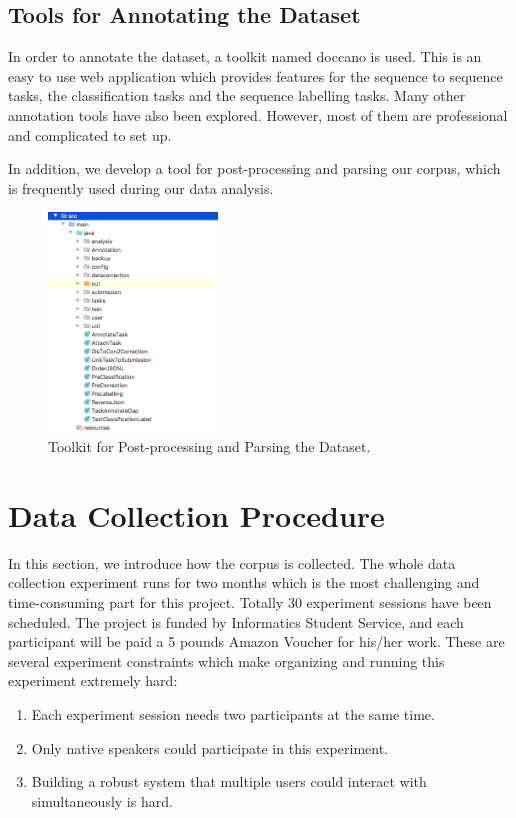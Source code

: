 \documentclass[bsc,frontabs,twoside,singlespacing,parskip,deptreport]{infthesis}     %
\begin{document}
\subsection{Tools for Annotating the Dataset}

In order to annotate the dataset, a toolkit named doccano \cite{doccano} is used. This is an easy to use web application which provides features for the sequence to sequence tasks, the classification tasks and the sequence labelling tasks. Many other annotation tools have also been explored. However, most of them are professional and complicated to set up.

In addition, we develop a tool for post-processing and parsing our corpus, which is frequently used during our data analysis.

\begin{figure}[h]
    \centering
    \includegraphics[width=0.4\textwidth]{parser.png}
    \caption{Toolkit for Post-processing and Parsing the Dataset.}
    \label{fig:parser}
\end{figure}

\newpage
\section{Data Collection Procedure}

In this section, we introduce how the corpus is collected. The whole data collection experiment runs for two months which is the most challenging and time-consuming part for this project. Totally 30 experiment sessions have been scheduled. The project is funded by Informatics Student Service, and each participant will be paid a 5 pounds Amazon Voucher for his/her work. These are several experiment constraints which make organizing and running this experiment extremely hard:

\begin{enumerate}
   \item Each experiment session needs two participants at the same time. 

   \item Only native speakers could participate in this experiment.
 
   \item Building a robust system that multiple users could interact with simultaneously is hard. 
       
\end{enumerate}
\end{document}
